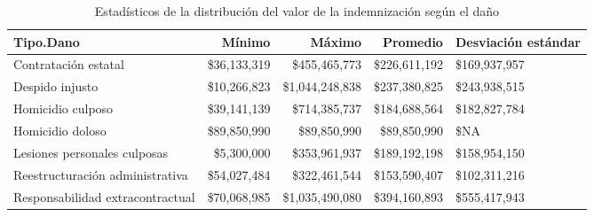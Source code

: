 \begin{table}[htbp]
\centering
\caption{Estadísticos de la distribución del
valor de la indemnización según el daño} 
\label{tab:indemnizacion-dano}
\begin{tabular}{lrrrR{2cm}}
  \hline
Tipo.Dano & Mínimo & Máximo & Promedio & Desviación estándar \\ 
  \hline
Contratación estatal & \$36,133,319 & \$455,465,773 & \$226,611,192 & \$169,937,957 \\ 
  Despido injusto & \$10,266,823 & \$1,044,248,838 & \$237,380,825 & \$243,938,515 \\ 
  Homicidio culposo & \$39,141,139 & \$714,385,737 & \$184,688,564 & \$182,827,784 \\ 
  Homicidio doloso & \$89,850,990 & \$89,850,990 & \$89,850,990 & \$NA \\ 
  Lesiones personales culposas & \$5,300,000 & \$353,961,937 & \$189,192,198 & \$158,954,150 \\ 
  Reestructuración administrativa & \$54,027,484 & \$322,461,544 & \$153,590,407 & \$102,311,216 \\ 
  Responsabilidad extracontractual & \$70,068,985 & \$1,035,490,080 & \$394,160,893 & \$555,417,943 \\ 
   \hline
\end{tabular}
\end{table}
